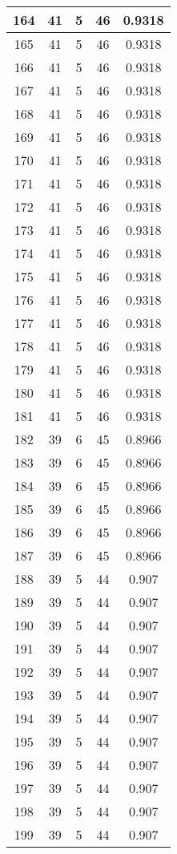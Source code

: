 \documentclass[letterpaper, 12pt]{article}
\begin{document}
\begin{longtable}{|c|c|c|c|c|}
\hline
164 & 41 & 5 & 46 & 0.9318 \\
\hline
165 & 41 & 5 & 46 & 0.9318 \\
\hline
166 & 41 & 5 & 46 & 0.9318 \\
\hline
167 & 41 & 5 & 46 & 0.9318 \\
\hline
168 & 41 & 5 & 46 & 0.9318 \\
\hline
169 & 41 & 5 & 46 & 0.9318 \\
\hline
170 & 41 & 5 & 46 & 0.9318 \\
\hline
171 & 41 & 5 & 46 & 0.9318 \\
\hline
172 & 41 & 5 & 46 & 0.9318 \\
\hline
173 & 41 & 5 & 46 & 0.9318 \\
\hline
174 & 41 & 5 & 46 & 0.9318 \\
\hline
175 & 41 & 5 & 46 & 0.9318 \\
\hline
176 & 41 & 5 & 46 & 0.9318 \\
\hline
177 & 41 & 5 & 46 & 0.9318 \\
\hline
178 & 41 & 5 & 46 & 0.9318 \\
\hline
179 & 41 & 5 & 46 & 0.9318 \\
\hline
180 & 41 & 5 & 46 & 0.9318 \\
\hline
181 & 41 & 5 & 46 & 0.9318 \\
\hline
182 & 39 & 6 & 45 & 0.8966 \\
\hline
183 & 39 & 6 & 45 & 0.8966 \\
\hline
184 & 39 & 6 & 45 & 0.8966 \\
\hline
185 & 39 & 6 & 45 & 0.8966 \\
\hline
186 & 39 & 6 & 45 & 0.8966 \\
\hline
187 & 39 & 6 & 45 & 0.8966 \\
\hline
188 & 39 & 5 & 44 & 0.907 \\
\hline
189 & 39 & 5 & 44 & 0.907 \\
\hline
190 & 39 & 5 & 44 & 0.907 \\
\hline
191 & 39 & 5 & 44 & 0.907 \\
\hline
192 & 39 & 5 & 44 & 0.907 \\
\hline
193 & 39 & 5 & 44 & 0.907 \\
\hline
194 & 39 & 5 & 44 & 0.907 \\
\hline
195 & 39 & 5 & 44 & 0.907 \\
\hline
196 & 39 & 5 & 44 & 0.907 \\
\hline
197 & 39 & 5 & 44 & 0.907 \\
\hline
198 & 39 & 5 & 44 & 0.907 \\
\hline
199 & 39 & 5 & 44 & 0.907 \\
\hline
\end{longtable}
\end{document}
